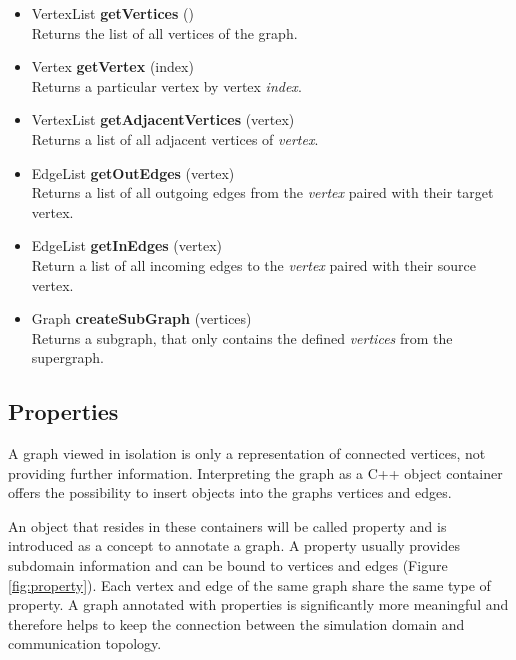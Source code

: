 \begin{itemize}
  \item VertexList \textbf{getVertices} ()\\
    Returns the list of all vertices of the graph.
    
  \item  Vertex \textbf{getVertex} (index)\\
    Returns a particular vertex by vertex \textit{index}.

  \item  VertexList \textbf{getAdjacentVertices} (vertex)\\
    Returns a list of all adjacent vertices of \textit{vertex}.

  \item  EdgeList \textbf{getOutEdges} (vertex)\\
    Returns a list of all outgoing edges from the \textit{vertex}
    paired with their target vertex.

  \item  EdgeList \textbf{getInEdges} (vertex)\\
    Return a list of all incoming edges to the \textit{vertex}
    paired with their source vertex.

  \item  Graph \textbf{createSubGraph} (vertices)\\
    Returns a subgraph, that only contains the defined
    \textit{vertices} from the supergraph.
\end{itemize}

\subsection{Properties}
A graph viewed in isolation is only a representation of connected
vertices, not providing further information. Interpreting the graph as
a C++ object container offers the possibility to insert objects into the graphs
vertices and edges.

An object that resides in these containers will be called property and
is introduced as a concept to annotate a graph. A property usually
provides subdomain information and can be bound to vertices and edges
(Figure \ref{fig:property}). Each vertex and edge of the same graph
share the same type of property. A graph annotated with
properties is significantly more meaningful and therefore helps to
keep the connection between the simulation domain and communication
topology.

